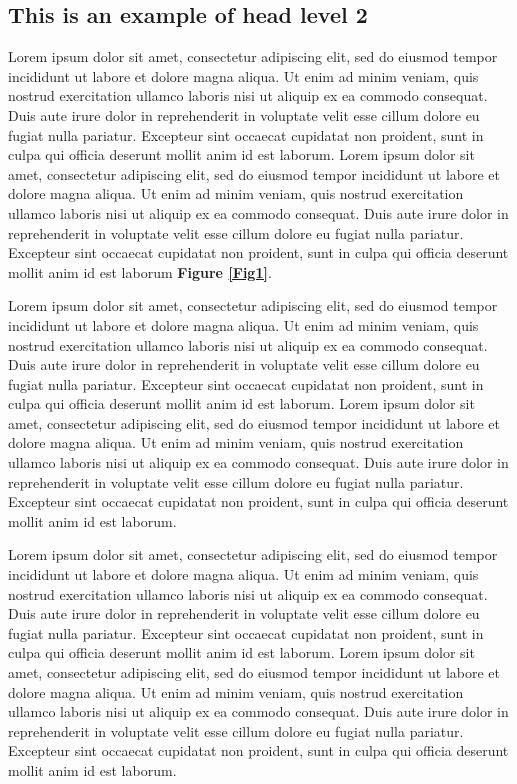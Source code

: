 \documentclass[english]{sbcreviews-2025}%
\begin{document}
\subsection{This is an example of head level 2}

Lorem ipsum dolor sit amet, consectetur adipiscing elit, sed do eiusmod tempor incididunt ut labore et dolore magna aliqua. Ut enim ad minim veniam, quis nostrud exercitation ullamco laboris nisi ut aliquip ex ea commodo consequat. Duis aute irure dolor in reprehenderit in voluptate velit esse cillum dolore eu fugiat nulla pariatur. Excepteur sint occaecat cupidatat non proident, sunt in culpa qui officia deserunt mollit anim id est laborum. Lorem ipsum dolor sit amet, consectetur adipiscing elit, sed do eiusmod tempor incididunt ut labore et dolore magna aliqua. Ut enim ad minim veniam, quis nostrud exercitation ullamco laboris nisi ut aliquip ex ea commodo consequat. Duis aute irure dolor in reprehenderit in voluptate velit esse cillum dolore eu fugiat nulla pariatur. Excepteur sint occaecat cupidatat non proident, sunt in culpa qui officia deserunt mollit anim id est laborum \textbf{Figure \ref{Fig1}}.

Lorem ipsum dolor sit amet, consectetur adipiscing elit, sed do eiusmod tempor incididunt ut labore et dolore magna aliqua. Ut enim ad minim veniam, quis nostrud exercitation ullamco laboris nisi ut aliquip ex ea commodo consequat. Duis aute irure dolor in reprehenderit in voluptate velit esse cillum dolore eu fugiat nulla pariatur. Excepteur sint occaecat cupidatat non proident, sunt in culpa qui officia deserunt mollit anim id est laborum. Lorem ipsum dolor sit amet, consectetur adipiscing elit, sed do eiusmod tempor incididunt ut labore et dolore magna aliqua. Ut enim ad minim veniam, quis nostrud exercitation ullamco laboris nisi ut aliquip ex ea commodo consequat. Duis aute irure dolor in reprehenderit in voluptate velit esse cillum dolore eu fugiat nulla pariatur. Excepteur sint occaecat cupidatat non proident, sunt in culpa qui officia deserunt mollit anim id est laborum.

Lorem ipsum dolor sit amet, consectetur adipiscing elit, sed do eiusmod tempor incididunt ut labore et dolore magna aliqua. Ut enim ad minim veniam, quis nostrud exercitation ullamco laboris nisi ut aliquip ex ea commodo consequat. Duis aute irure dolor in reprehenderit in voluptate velit esse cillum dolore eu fugiat nulla pariatur. Excepteur sint occaecat cupidatat non proident, sunt in culpa qui officia deserunt mollit anim id est laborum. Lorem ipsum dolor sit amet, consectetur adipiscing elit, sed do eiusmod tempor incididunt ut labore et dolore magna aliqua. Ut enim ad minim veniam, quis nostrud exercitation ullamco laboris nisi ut aliquip ex ea commodo consequat. Duis aute irure dolor in reprehenderit in voluptate velit esse cillum dolore eu fugiat nulla pariatur. Excepteur sint occaecat cupidatat non proident, sunt in culpa qui officia deserunt mollit anim id est laborum.
\end{document}
